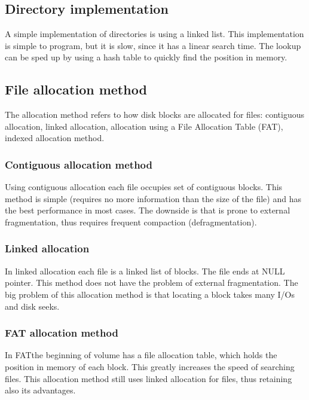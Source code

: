 \subsection{Directory implementation}
A simple implementation of directories is using a linked list. This implementation is simple to program, but it is slow, since it has a linear search time. The lookup can be sped up by using a hash table to quickly find the position in memory.


\subsection{File allocation method}
The allocation method refers to how disk blocks are allocated for files: contiguous allocation, linked allocation, allocation using a File Allocation Table (FAT), indexed allocation method.

\subsubsection{Contiguous allocation method}
Using contiguous allocation each file occupies set of contiguous blocks. This method is simple (requires no more information than the size of the file)  and has the best performance in most cases. The downside is that is prone to external fragmentation, thus requires frequent compaction (defragmentation).


\subsubsection{Linked allocation}
In linked allocation each file is a linked list of blocks. The file ends at NULL pointer. This method does not have the problem of external fragmentation. The big problem of this allocation method is that locating a block takes many I/Os and disk seeks.


\subsubsection{FAT allocation method}
In FATthe beginning of volume has a file allocation table, which holds the position in memory of each block. This greatly increases the speed of searching files. This allocation method still uses linked allocation for files, thus retaining also its advantages.

